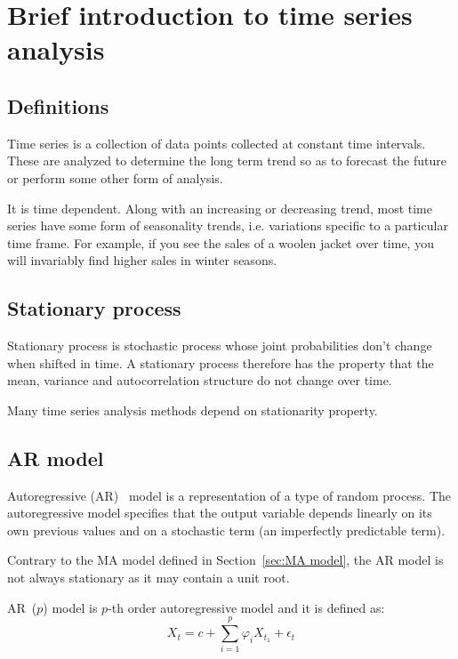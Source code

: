 
\chapter{Brief introduction to time series analysis}
\label{chap:Brief introduction to time series analysis}

\section{Definitions}
\label{sec:Definitions}

Time series is a collection of data points collected at constant time intervals. These are analyzed to determine the long term trend so as to forecast the future or perform some other form of analysis.

It is time dependent. Along with an increasing or decreasing trend, most time series have some form of seasonality trends, i.e. variations specific to a particular time frame. For example, if you see the sales of a woolen jacket over time, you will invariably find higher sales in winter seasons.

\section{Stationary process}
\label{sec:Stationary process}

Stationary process is stochastic process whose joint probabilities don't change when shifted in time. A stationary process therefore has the property that the mean, variance and autocorrelation structure do not change over time.

Many time series analysis methods depend on stationarity property.

\section{AR model}
\label{sec:AR model}

Autoregressive (AR)~\cite{tsa} model is a representation of a type of random process. The autoregressive model specifies that the output variable depends linearly on its own previous values and on a stochastic term (an imperfectly predictable term).

Contrary to the MA model defined in Section~\ref{sec:MA model}, the AR model is not always stationary as it may contain a unit root.

AR~($p$) model is $p$-th order autoregressive model and it is defined as:
\begin{equation*}
  X_t = c + \sum_{i=1}^p{\varphi_i X_{t_1}} + \epsilon_t
\end{equation*}

